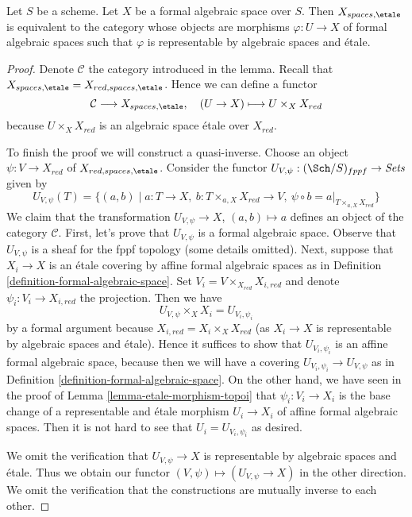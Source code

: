 \begin{lemma}
\label{lemma-identify-spaces-etale}
Let $S$ be a scheme. Let $X$ be a formal algebraic space over $S$.
Then $X_{spaces, \etale}$ is equivalent to the category whose objects
are morphisms $\varphi : U \to X$ of formal algebraic spaces such that
$\varphi$ is representable by algebraic spaces and \'etale.
\end{lemma}

\begin{proof}
Denote $\mathcal{C}$ the category introduced in the lemma.
Recall that $X_{spaces, \etale} = X_{red, spaces, \etale}$.
Hence we can define a functor
$$
\mathcal{C} \longrightarrow X_{spaces, \etale},\quad
(U \to X) \longmapsto U \times_X X_{red}
$$
because $U \times_X X_{red}$ is an algebraic space \'etale over $X_{red}$.

\medskip\noindent
To finish the proof we will construct a quasi-inverse.
Choose an object $\psi : V \to X_{red}$ of $X_{red, spaces, \etale}$.
Consider the functor
$U_{V, \psi} : (\Sch/S)_{fppf} \to \textit{Sets}$ given by
$$
U_{V, \psi}(T) = \{(a, b) \mid
a : T \to X,
\ b : T \times_{a, X} X_{red} \to V,
\ \psi \circ b = a|_{T \times_{a, X} X_{red}}\}
$$
We claim that the transformation $U_{V, \psi} \to X$, $(a, b) \mapsto a$
defines an object of the category $\mathcal{C}$.
First, let's prove that $U_{V, \psi}$ is a formal algebraic space.
Observe that $U_{V, \psi}$ is a sheaf for the fppf topology (some details
omitted). Next, suppose that $X_i \to X$ is an \'etale covering by
affine formal algebraic spaces as in
Definition \ref{definition-formal-algebraic-space}.
Set $V_i = V \times_{X_{red}} X_{i, red}$ and denote
$\psi_i : V_i \to X_{i, red}$ the projection. Then 
we have
$$
U_{V, \psi} \times_X X_i = U_{V_i, \psi_i}
$$
by a formal argument because $X_{i, red} = X_i \times_X X_{red}$
(as $X_i \to X$ is representable by algebraic spaces and \'etale).
Hence it suffices to show that $U_{V_i, \psi_i}$ is an
affine formal algebraic space, because then we will have
a covering $U_{V_i, \psi_i} \to U_{V, \psi}$ as in
Definition \ref{definition-formal-algebraic-space}.
On the other hand, we have seen in the proof of
Lemma \ref{lemma-etale-morphism-topoi}
that $\psi_i : V_i \to X_i$ is the base
change of a representable and \'etale morphism
$U_i \to X_i$ of affine formal algebraic spaces.
Then it is not hard to see that $U_i = U_{V_i, \psi_i}$
as desired.

\medskip\noindent
We omit the verification that $U_{V, \psi} \to X$
is representable by algebraic spaces and \'etale.
Thus we obtain our functor $(V, \psi) \mapsto (U_{V, \psi} \to X)$
in the other direction.
We omit the verification that the constructions
are mutually inverse to each other.
\end{proof}

